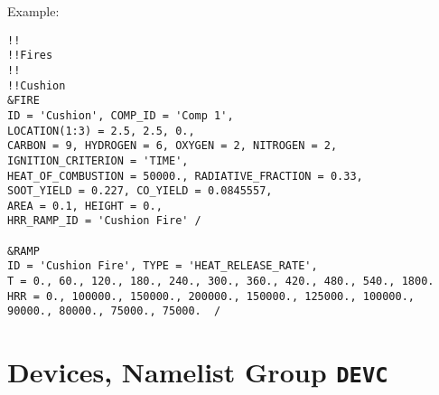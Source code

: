 \vspace{\baselineskip}
\noindent Example:
\begin{lstlisting}
!!
!!Fires
!!
!!Cushion
&FIRE
ID = 'Cushion', COMP_ID = 'Comp 1',
LOCATION(1:3) = 2.5, 2.5, 0.,
CARBON = 9, HYDROGEN = 6, OXYGEN = 2, NITROGEN = 2,
IGNITION_CRITERION = 'TIME',
HEAT_OF_COMBUSTION = 50000., RADIATIVE_FRACTION = 0.33,
SOOT_YIELD = 0.227, CO_YIELD = 0.0845557,
AREA = 0.1, HEIGHT = 0.,
HRR_RAMP_ID = 'Cushion Fire' /

&RAMP
ID = 'Cushion Fire', TYPE = 'HEAT_RELEASE_RATE',
T = 0., 60., 120., 180., 240., 300., 360., 420., 480., 540., 1800.
HRR = 0., 100000., 150000., 200000., 150000., 125000., 100000., 90000., 80000., 75000., 75000.  /
\end{lstlisting}




\clearpage
\section{Devices, Namelist Group \texorpdfstring{{\tt DEVC}}{DEVC}}

